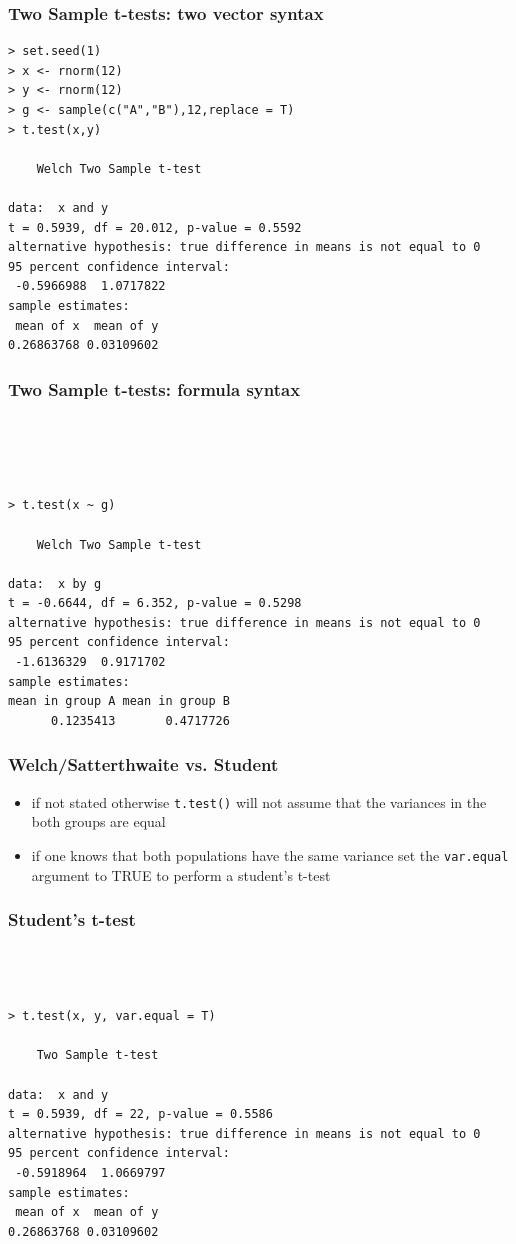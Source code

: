 \documentclass[xcolor={table}]{beamer}
\begin{document}
\begin{frame}[fragile]\frametitle{Two Sample t-tests: two vector syntax}\footnotesize
\begin{verbatim}
> set.seed(1)
> x <- rnorm(12)
> y <- rnorm(12)
> g <- sample(c("A","B"),12,replace = T)
> t.test(x,y)

	Welch Two Sample t-test

data:  x and y
t = 0.5939, df = 20.012, p-value = 0.5592
alternative hypothesis: true difference in means is not equal to 0
95 percent confidence interval:
 -0.5966988  1.0717822
sample estimates:
 mean of x  mean of y 
0.26863768 0.03109602   
\end{verbatim}
\end{frame}


\begin{frame}[fragile]\frametitle{Two Sample t-tests: formula syntax}\footnotesize
\begin{verbatim}




> t.test(x ~ g)

	Welch Two Sample t-test

data:  x by g
t = -0.6644, df = 6.352, p-value = 0.5298
alternative hypothesis: true difference in means is not equal to 0
95 percent confidence interval:
 -1.6136329  0.9171702
sample estimates:
mean in group A mean in group B 
      0.1235413       0.4717726 
\end{verbatim}
\end{frame}


\begin{frame}[fragile]\frametitle{Welch/Satterthwaite vs. Student}
  \begin{itemize}
  \item if not stated otherwise \texttt{t.test()} will not assume that the variances in the both groups are equal
  \item if one knows that both populations have the same variance set the \texttt{var.equal} argument to TRUE to perform a student's t-test
  \end{itemize}
\end{frame}

\begin{frame}[fragile]\frametitle{Student's t-test}\footnotesize
\begin{verbatim}



> t.test(x, y, var.equal = T)

	Two Sample t-test

data:  x and y
t = 0.5939, df = 22, p-value = 0.5586
alternative hypothesis: true difference in means is not equal to 0
95 percent confidence interval:
 -0.5918964  1.0669797
sample estimates:
 mean of x  mean of y 
0.26863768 0.03109602   
\end{verbatim}
\end{frame}
\end{document}
